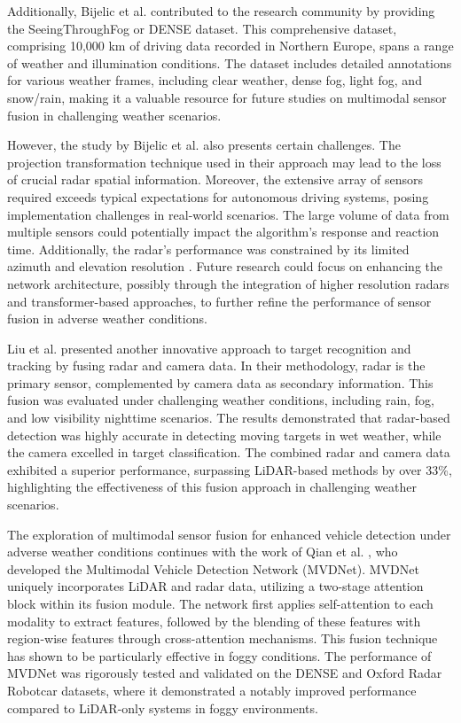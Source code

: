 \documentclass[report.tex]{subfiles}
\begin{document}
    Additionally, Bijelic et al. \cite{bijelic2020seeing} contributed to the research community by providing the SeeingThroughFog or DENSE dataset. This comprehensive dataset, comprising 10,000 km of driving data recorded in Northern Europe, spans a range of weather and illumination conditions. The dataset includes detailed annotations for various weather frames, including clear weather, dense fog, light fog, and snow/rain, making it a valuable resource for future studies on multimodal sensor fusion in challenging weather scenarios.

    However, the study by Bijelic et al. \cite{bijelic2020seeing} also presents certain challenges. The projection transformation technique used in their approach may lead to the loss of crucial radar spatial information. Moreover, the extensive array of sensors required exceeds typical expectations for autonomous driving systems, posing implementation challenges in real-world scenarios. The large volume of data from multiple sensors could potentially impact the algorithm's response and reaction time. Additionally, the radar's performance was constrained by its limited azimuth and elevation resolution \cite{zhang2023perception}. Future research could focus on enhancing the network architecture, possibly through the integration of higher resolution radars and transformer-based approaches, to further refine the performance of sensor fusion in adverse weather conditions.

    Liu et al. \cite{liu2021robust} presented another innovative approach to target recognition and tracking by fusing radar and camera data. In their methodology, radar is the primary sensor, complemented by camera data as secondary information. This fusion was evaluated under challenging weather conditions, including rain, fog, and low visibility nighttime scenarios. The results demonstrated that radar-based detection was highly accurate in detecting moving targets in wet weather, while the camera excelled in target classification. The combined radar and camera data exhibited a superior performance, surpassing LiDAR-based methods by over 33\%, highlighting the effectiveness of this fusion approach in challenging weather scenarios.

    The exploration of multimodal sensor fusion for enhanced vehicle detection under adverse weather conditions continues with the work of Qian et al. \cite{qian2021robust}, who developed the Multimodal Vehicle Detection Network (MVDNet). MVDNet uniquely incorporates LiDAR and radar data, utilizing a two-stage attention block within its fusion module. The network first applies self-attention to each modality to extract features, followed by the blending of these features with region-wise features through cross-attention mechanisms. This fusion technique has shown to be particularly effective in foggy conditions. The performance of MVDNet was rigorously tested and validated on the DENSE \cite{bijelic2020seeing} and Oxford Radar Robotcar \cite{barnes2020oxford} datasets, where it demonstrated a notably improved performance compared to LiDAR-only systems in foggy environments.
\end{document}
